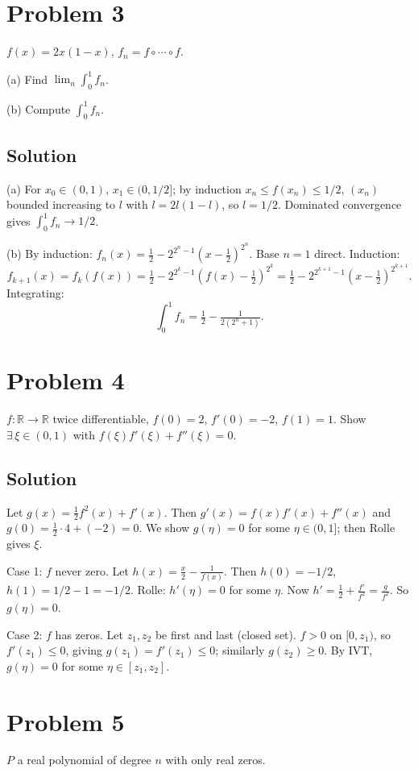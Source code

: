 \documentclass{article}
\begin{document}
\section*{Problem 3}
$f(x)=2x(1-x)$, $f_n = f\circ\cdots\circ f$.

(a) Find $\lim_n \int_0^1 f_n$.

(b) Compute $\int_0^1 f_n$.

\subsection*{Solution}
(a) For $x_0\in(0,1)$, $x_1\in(0,1/2]$; by induction $x_n\le f(x_n)\le 1/2$, $(x_n)$ bounded increasing to $l$ with $l=2l(1-l)$, so $l=1/2$. Dominated convergence gives $\int_0^1 f_n\to 1/2$.

(b) By induction: $f_n(x) = \frac 12 - 2^{2^n-1}(x-\frac 12)^{2^n}$. Base $n=1$ direct. Induction:
\[f_{k+1}(x) = f_k(f(x)) = \tfrac 12 - 2^{2^k-1}(f(x)-\tfrac 12)^{2^k} = \tfrac 12 - 2^{2^{k+1}-1}(x-\tfrac 12)^{2^{k+1}}.\]
Integrating:
\[\int_0^1 f_n = \tfrac 12 - \tfrac{1}{2(2^n+1)}.\]

\section*{Problem 4}
$f:\mathbb{R}\to\mathbb{R}$ twice differentiable, $f(0)=2$, $f'(0)=-2$, $f(1)=1$. Show $\exists\,\xi\in(0,1)$ with $f(\xi)f'(\xi)+f''(\xi)=0$.

\subsection*{Solution}
Let $g(x) = \tfrac 12 f^2(x) + f'(x)$. Then $g'(x) = f(x)f'(x)+f''(x)$ and $g(0) = \tfrac 12\cdot 4 + (-2) = 0$. We show $g(\eta)=0$ for some $\eta\in(0,1]$; then Rolle gives $\xi$.

Case 1: $f$ never zero. Let $h(x) = \tfrac x2 - \tfrac{1}{f(x)}$. Then $h(0) = -1/2$, $h(1) = 1/2 - 1 = -1/2$. Rolle: $h'(\eta)=0$ for some $\eta$. Now $h' = \tfrac 12 + \tfrac{f'}{f^2} = \tfrac{g}{f^2}$. So $g(\eta)=0$.

Case 2: $f$ has zeros. Let $z_1, z_2$ be first and last (closed set). $f>0$ on $[0,z_1)$, so $f'(z_1)\le 0$, giving $g(z_1)=f'(z_1)\le 0$; similarly $g(z_2)\ge 0$. By IVT, $g(\eta)=0$ for some $\eta\in[z_1,z_2]$.

\section*{Problem 5}
$P$ a real polynomial of degree $n$ with only real zeros.
\end{document}
